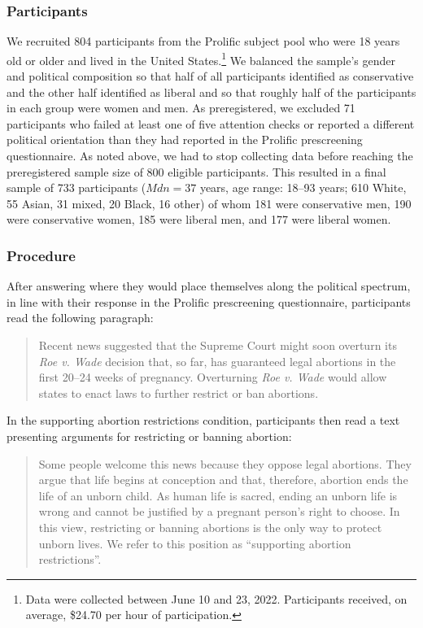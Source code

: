 \documentclass[twocolumn, 11pt, letterpaper]{article}
\begin{document}
\hypertarget{participants-2}{%
\subsubsection{Participants}\label{participants-2}}

We recruited 804 participants from the Prolific subject pool who were 18
years old or older and lived in the United States.\footnote{Data were
  collected between June 10 and 23, 2022. Participants received, on
  average, \$24.70 per hour of participation.} We balanced the sample's
gender and political composition so that half of all participants
identified as conservative and the other half identified as liberal and
so that roughly half of the participants in each group were women and
men. As preregistered, we excluded 71 participants who failed at least
one of five attention checks or reported a different political
orientation than they had reported in the Prolific prescreening
questionnaire. As noted above, we had to stop collecting data before
reaching the preregistered sample size of 800 eligible participants.
This resulted in a final sample of 733 participants
(\(\textit{Mdn} = 37\) years, age range: 18--93 years; 610 White, 55
Asian, 31 mixed, 20 Black, 16 other) of whom 181 were conservative men,
190 were conservative women, 185 were liberal men, and 177 were liberal
women.

\hypertarget{procedure-2}{%
\subsubsection{Procedure}\label{procedure-2}}

After answering where they would place themselves along the political
spectrum, in line with their response in the Prolific prescreening
questionnaire, participants read the following paragraph:

\begin{quote}
Recent news suggested that the Supreme Court might soon overturn its
\emph{Roe v. Wade} decision that, so far, has guaranteed legal abortions
in the first 20--24 weeks of pregnancy. Overturning \emph{Roe v. Wade}
would allow states to enact laws to further restrict or ban abortions.
\end{quote}

\noindent In the supporting abortion restrictions condition,
participants then read a text presenting arguments for restricting or
banning abortion:

\begin{quote}
Some people welcome this news because they oppose legal abortions. They
argue that life begins at conception and that, therefore, abortion ends
the life of an unborn child. As human life is sacred, ending an unborn
life is wrong and cannot be justified by a pregnant person's right to
choose. In this view, restricting or banning abortions is the only way
to protect unborn lives. We refer to this position as ``supporting
abortion restrictions''.
\end{quote}
\end{document}
